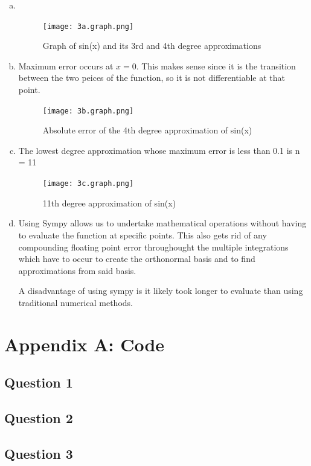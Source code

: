 \documentclass[11pt]{article}
\begin{document}
\begin{enumerate}[a)]
\item~
\begin{figure}[h!]
\centering
\texttt{[image: 3a.graph.png]}
\caption{Graph of sin(x) and its 3rd and 4th degree approximations}
\end{figure}

\item Maximum error occurs at $x = 0$. This makes sense since it is the transition between the two peices of the function, so it is not differentiable at that point.
\begin{figure}[h!]
\centering
\texttt{[image: 3b.graph.png]}
\caption{Absolute error of the 4th degree approximation of sin(x)}
\end{figure}

\pagebreak
\item The lowest degree approximation whose maximum error is less than 0.1 is n = 11
\begin{figure}[h!]
\centering
\texttt{[image: 3c.graph.png]}
\caption{11th degree approximation of sin(x)}
\end{figure}

\item
Using Sympy allows us to undertake mathematical operations without having to evaluate the function at specific points.
This also gets rid of any compounding floating point error throughought the multiple integrations which have to occur to create the orthonormal basis and to find approximations from said basis.

A disadvantage of using sympy is it likely took longer to evaluate than using traditional numerical methods.
\end{enumerate}

\pagebreak
\section*{Appendix A: Code}
\subsection*{Question 1}

\subsection*{Question 2}

\subsection*{Question 3}

\end{document}
